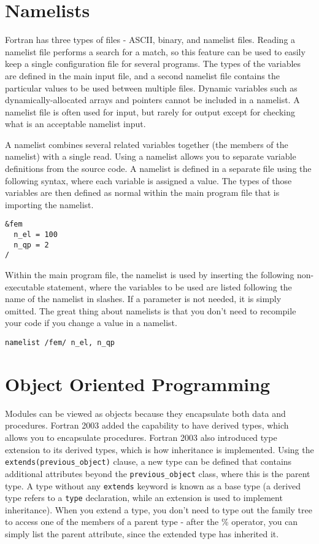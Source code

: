 \documentclass[10pt]{article}
\begin{document}
\section{Namelists}
Fortran has three types of files - ASCII, binary, and namelist files. Reading a namelist file performs a search for a match, so this feature can be used to easily keep a single configuration file for several programs. The types of the variables are defined in the main input file, and a second namelist file contains the particular values to be used between multiple files. Dynamic variables such as dynamically-allocated arrays and pointers cannot be included in a namelist. A namelist file is often used for input, but rarely for output except for checking what is an acceptable namelist input. 

A namelist combines several related variables together (the members of the namelist) with a single read. Using a namelist allows you to separate variable definitions from the source code. A namelist is defined in a separate file using the following syntax, where each variable is assigned a value. The types of those variables are then defined as normal within the main program file that is importing the namelist.

\begin{lstlisting}
&fem
  n_el = 100
  n_qp = 2
/
\end{lstlisting}

Within the main program file, the namelist is used by inserting the following non-executable statement, where the variables to be used are listed following the name of the namelist in slashes. If a parameter is not needed, it is simply omitted. The great thing about namelists is that you don't need to recompile your code if you change a value in a namelist. 

\begin{lstlisting}
namelist /fem/ n_el, n_qp
\end{lstlisting}

\section{Object Oriented Programming}
Modules can be viewed as objects because they encapsulate both data and procedures. Fortran 2003 added the capability to have derived types, which allows you to encapsulate procedures. Fortran 2003 also introduced type extension to its derived types, which is how inheritance is implemented. Using the {\tt extends(previous\_object)} clause, a new type can be defined that contains additional attributes beyond the {\tt previous\_object} class, where this is the parent type. A type without any {\tt extends} keyword is known as a base type (a derived type refers to a {\tt type} declaration, while an extension is used to implement inheritance). When you extend a type, you don't need to type out the family tree to access one of the members of a parent type - after the \% operator, you can simply list the parent attribute, since the extended type has inherited it.
\end{document}
